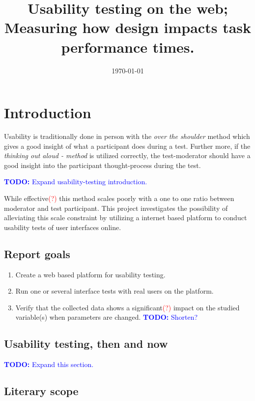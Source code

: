 \documentclass[nofilelist]{cslthse-msc}
\title{
  Usability testing on the web; Measuring how design impacts task performance
  times.
}
\date{\today}
\begin{document}
\renewcommand{\bibname}{References}

\makefrontmatter
\newcommand{\todo}[1]{\textcolor{blue}{\textbf{TODO:} #1}}
\newcommand{\eatdot}[1]{}
\newcommand{\ctitle}[1]{\citetitle{#1}\cite{#1}}
\newcommand{\vv}[1]{\unskip}
\newcommand{\cc}[0]{\textcolor{red}{(?)} }

\chapter{Introduction}

	Usability is traditionally done in person with the
	\textit{over the shoulder} method which gives a good insight of what a
	participant does during a test. Further more, if the
	\textit{thinking out aloud - method} is utilized correctly, the
	test-moderator should have a good insight into the participant
	thought-process during the test.

	\todo{Expand usability-testing introduction.}

	While effective\cc this method scales poorly with a one to one ratio between
	moderator and test participant. This project investigates the possibility of
	alleviating this scale constraint by utilizing a internet based platform
	to conduct usability tests of user interfaces online.

	\section{Report goals}

		\begin{enumerate}
			\item{Create a web based platform for usability testing.}
			\item{Run one or several interface tests with real users on the platform.}
			\item{
				Verify that the collected data shows a significant\cc impact on the studied
				variable(s) when parameters are changed. \todo{Shorten?}
			}
		\end{enumerate}

	\section{Usability testing, then and now}

		\todo{Expand this section.}

	\section{Literary scope}
\end{document}
